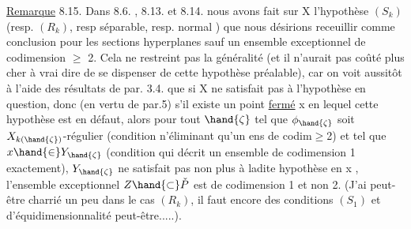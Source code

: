 \uline{Remarque} 8.15. Dans 8.6. , 8.13. et 8.14. nous avons fait sur X
l'hypothèse $(S_k)$ (resp. $(R_k)$, resp\unsure{:} séparable, resp.  normal ) que
nous désirions receuillir comme conclusion pour les sections hyperplanes
sauf  un ensemble exceptionnel de codimension $\geqslant$ 2. Cela ne restreint
pas la généralité (et il n'aurait pas coûté plus cher à vrai dire
de se dispenser de cette hypothèse préalable), car on voit aussitôt
à l'aide des résultats de par. 3.4.  que si X ne satisfait pas à
l'hypothèse en question, donc (en vertu de par.5) s'il existe un point
\uline{fermé} x en lequel cette hypothèse est en défaut, alors pour tout $\hand{\zeta}$ tel
que $\phi_{\hand{\zeta}}$ soit $X_{k(\hand{\zeta})}$-régulier (condition n'éliminant qu'un ens de codim$\geqslant$2)
et tel que $x \hand{\in} Y_{\hand{\zeta}}$ (condition qui décrit un ensemble de codimension 1
exactement), $Y_{\hand{\zeta}}$ ne satisfait pas non plus à ladite hypothèse en x ,
 l'ensemble exceptionnel $Z \hand{\subset} \check{P}$ est de codimension 1 et non 2.
(J'ai peut-être charrié un peu dans le cas $(R_k)$,  il faut encore
des conditions $(S_1)$ et d'équidimensionnalité peut-être.....).

